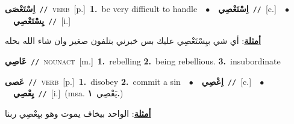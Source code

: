 \documentclass[10pt,a4paper,twoside]{article} %
\begin{document}
\begin{multicols}{2}
{\setlength\topsep{0pt}\textbf{\foreignlanguage{arabic}{اِسْتَعْصَى}}\ {\color{gray}\texttt{//}\color{black}}\ \textsc{verb}\ [p.]\ \textbf{1.}~be very difficult to handle\ \ $\bullet$\ \ \setlength\topsep{0pt}\textbf{\foreignlanguage{arabic}{اِسْتَعْصِي}}\ {\color{gray}\texttt{//}\color{black}}\ [c.]\ \ $\bullet$\ \ \setlength\topsep{0pt}\textbf{\foreignlanguage{arabic}{يِسْتَعْصِي}}\ {\color{gray}\texttt{//}\color{black}}\ [i.]\  \begin{flushright}\color{gray}\foreignlanguage{arabic}{\textbf{\underline{\foreignlanguage{arabic}{أمثلة}}}: أي شي بيِسْتَعْصِي عليك بس خبرني بتلفون صغير وان شاء الله بحله}\end{flushright}\color{black}} \vspace{2mm}

{\setlength\topsep{0pt}\textbf{\foreignlanguage{arabic}{عَاصِي}}\ {\color{gray}\texttt{//}\color{black}}\ \textsc{noun\textunderscore act}\ [m.]\ \textbf{1.}~rebelling  \textbf{2.}~being rebellious.  \textbf{3.}~insubordinate\ } \vspace{2mm}

{\setlength\topsep{0pt}\textbf{\foreignlanguage{arabic}{عَصى}}\ {\color{gray}\texttt{//}\color{black}}\ \textsc{verb}\ [p.]\ \textbf{1.}~disobey  \textbf{2.}~commit a sin\ \ $\bullet$\ \ \setlength\topsep{0pt}\textbf{\foreignlanguage{arabic}{اِعْصِي}}\ {\color{gray}\texttt{//}\color{black}}\ [c.]\ \ $\bullet$\ \ \setlength\topsep{0pt}\textbf{\foreignlanguage{arabic}{يِعْصِي}}\ {\color{gray}\texttt{//}\color{black}}\ [i.]\ \color{gray}(msa. \foreignlanguage{arabic}{يَعْصِي}~\foreignlanguage{arabic}{\textbf{١.}})\color{black}\  \begin{flushright}\color{gray}\foreignlanguage{arabic}{\textbf{\underline{\foreignlanguage{arabic}{أمثلة}}}: الواحد بيخاف يموت وهو بيِعْصِي ربنا}\end{flushright}\color{black}} \vspace{2mm}


\end{multicols}
\end{document}
